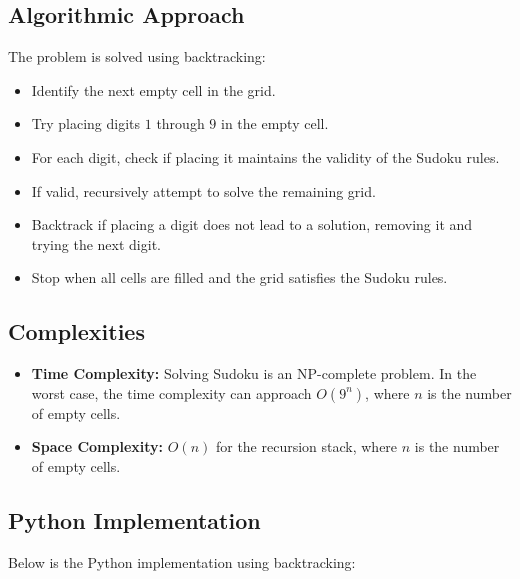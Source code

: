\subsection*{Algorithmic Approach}
The problem is solved using backtracking:
\begin{itemize}
    \item Identify the next empty cell in the grid.
    \item Try placing digits \(1\) through \(9\) in the empty cell.
    \item For each digit, check if placing it maintains the validity of the Sudoku rules.
    \item If valid, recursively attempt to solve the remaining grid.
    \item Backtrack if placing a digit does not lead to a solution, removing it and trying the next digit.
    \item Stop when all cells are filled and the grid satisfies the Sudoku rules.
\end{itemize}

\subsection*{Complexities}
\begin{itemize}
    \item \textbf{Time Complexity:} Solving Sudoku is an NP-complete problem. In the worst case, the time complexity can approach \(O(9^{n})\), where \(n\) is the number of empty cells.
    \item \textbf{Space Complexity:} \(O(n)\) for the recursion stack, where \(n\) is the number of empty cells.
\end{itemize}

\subsection*{Python Implementation}
Below is the Python implementation using backtracking:

